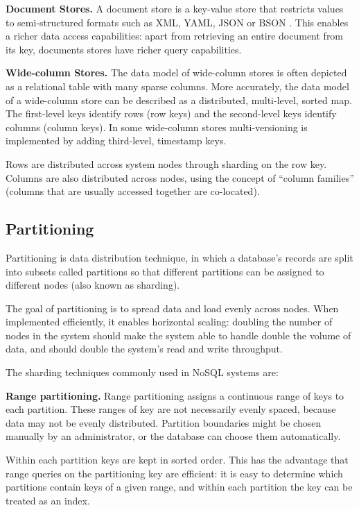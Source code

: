 \bigskip
\noindent
\textbf{Document Stores.} A document store is a key-value store that restricts values to semi-structured formats such as
XML, YAML, JSON or BSON \cite{bson:spec}.
This enables a richer data access capabilities: apart from retrieving an entire document from its key, documents stores
have richer query capabilities.

\bigskip
\noindent
\textbf{Wide-column Stores.} The data model of wide-column stores is often depicted as a relational table with many
sparse columns.
More accurately, the data model of a wide-column store can be described as a distributed, multi-level, sorted map.
The first-level keys identify rows (row keys) and the second-level keys identify columns (column keys).
In some wide-column stores multi-versioning is implemented by adding third-level, timestamp keys.

Rows are distributed across system nodes through sharding on the row key.
Columns are also distributed across nodes, using the concept of ``column families'' (columns that are usually accessed
together are co-located).

\subsection{Partitioning}
\label{sec:partitioning}

Partitioning is data distribution technique, in which a database's records are split into subsets called partitions so
that different partitions can be assigned to different nodes (also known as sharding).

The goal of partitioning is to spread data and load evenly across nodes.
When implemented efficiently, it enables horizontal scaling:
doubling the number of nodes in the system should make the system able to handle double the volume of data, and
should double the system's read and write throughput.

The sharding techniques commonly used in NoSQL systems are:

\bigskip
\noindent
\textbf{Range partitioning.}
Range partitioning assigns a continuous range of keys to each partition.
These ranges of key are not necessarily evenly spaced, because data may not be evenly distributed.
Partition boundaries might be chosen manually by an administrator, or the database can choose them automatically.

Within each partition keys are kept in sorted order.
This has the advantage that range queries on the partitioning key are efficient:
it is easy to determine which partitions contain keys of a given range, and within each partition the key can be treated
as an index.

